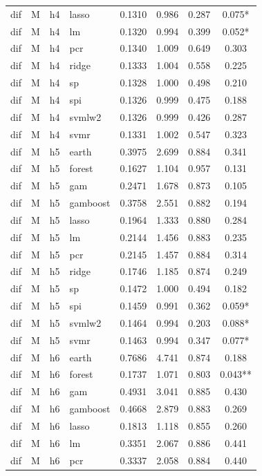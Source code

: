 \begin{ThreePartTable}
\begin{longtable}[t]{llclcccc}
dif & M & h4 & lasso & 0.1310 & 0.986 & 0.287 & 0.075*\\
dif & M & h4 & lm & 0.1320 & 0.994 & 0.399 & 0.052*\\
dif & M & h4 & pcr & 0.1340 & 1.009 & 0.649 & 0.303\\
dif & M & h4 & ridge & 0.1333 & 1.004 & 0.558 & 0.225\\
dif & M & h4 & sp & 0.1328 & 1.000 & 0.498 & 0.210\\
dif & M & h4 & spi & 0.1326 & 0.999 & 0.475 & 0.188\\
dif & M & h4 & svmlw2 & 0.1326 & 0.999 & 0.426 & 0.287\\
dif & M & h4 & svmr & 0.1331 & 1.002 & 0.547 & 0.323\\
\addlinespace
dif & M & h5 & earth & 0.3975 & 2.699 & 0.884 & 0.341\\
dif & M & h5 & forest & 0.1627 & 1.104 & 0.957 & 0.131\\
dif & M & h5 & gam & 0.2471 & 1.678 & 0.873 & 0.105\\
dif & M & h5 & gamboost & 0.3758 & 2.551 & 0.882 & 0.194\\
dif & M & h5 & lasso & 0.1964 & 1.333 & 0.880 & 0.284\\
dif & M & h5 & lm & 0.2144 & 1.456 & 0.883 & 0.235\\
dif & M & h5 & pcr & 0.2145 & 1.457 & 0.884 & 0.314\\
dif & M & h5 & ridge & 0.1746 & 1.185 & 0.874 & 0.249\\
dif & M & h5 & sp & 0.1472 & 1.000 & 0.494 & 0.182\\
dif & M & h5 & spi & 0.1459 & 0.991 & 0.362 & 0.059*\\
dif & M & h5 & svmlw2 & 0.1464 & 0.994 & 0.203 & 0.088*\\
dif & M & h5 & svmr & 0.1463 & 0.994 & 0.347 & 0.077*\\
\addlinespace
dif & M & h6 & earth & 0.7686 & 4.741 & 0.874 & 0.188\\
dif & M & h6 & forest & 0.1737 & 1.071 & 0.803 & 0.043**\\
dif & M & h6 & gam & 0.4931 & 3.041 & 0.885 & 0.430\\
dif & M & h6 & gamboost & 0.4668 & 2.879 & 0.883 & 0.269\\
dif & M & h6 & lasso & 0.1813 & 1.118 & 0.855 & 0.260\\
dif & M & h6 & lm & 0.3351 & 2.067 & 0.886 & 0.441\\
dif & M & h6 & pcr & 0.3337 & 2.058 & 0.884 & 0.440\\

\end{longtable}
\end{ThreePartTable}
